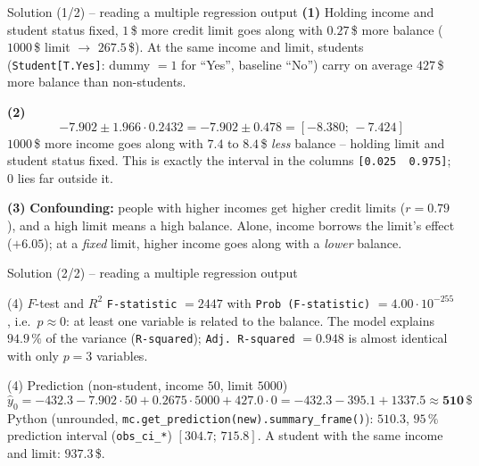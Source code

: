 \documentclass[aspectratio=169,11pt]{beamer}
\begin{document}
\begin{frame}{Solution (1/2) -- reading a multiple regression output}
  \textbf{(1)} Holding income and student status fixed, $1$\,\$ more credit
  limit goes along with $0.27$\,\$ more balance ($1000$\,\$ limit
  $\to$ $267.5$\,\$). At the same income and limit, students
  (\texttt{Student[T.Yes]}: dummy $=1$ for ``Yes'', baseline ``No'') carry on
  average $427$\,\$ more balance than non-students.

  \medskip
  \textbf{(2)}
  \[
    -7.902\pm1.966\cdot0.2432=-7.902\pm0.478=[-8.380;\,-7.424]
  \]
  $1000$\,\$ more income goes along with $7.4$ to $8.4$\,\$ \emph{less} balance
  -- holding limit and student status fixed. This is exactly the interval in
  the columns \texttt{[0.025\ \ 0.975]}; $0$ lies far outside it.

  \medskip
  \textbf{(3)} \textbf{Confounding:} people with higher incomes get higher
  credit limits ($r=0.79$), and a high limit means a high balance. Alone,
  income borrows the limit's effect ($+6.05$); at a \emph{fixed} limit,
  higher income goes along with a \emph{lower} balance.
\end{frame}

\begin{frame}{Solution (2/2) -- reading a multiple regression output}
  \begin{exampleblock}{(4) $F$-test and $R^2$}
    \texttt{F-statistic} $=2447$ with \texttt{Prob (F-statistic)}
    $=4.00\cdot10^{-255}$, i.e.\ $p\approx0$: at least one variable is related
    to the balance. The model explains $94.9\,\%$ of the variance
    (\texttt{R-squared}); \texttt{Adj.\ R-squared} $=0.948$ is almost
    identical with only $p=3$ variables.
  \end{exampleblock}
  \begin{exampleblock}{(4) Prediction (non-student, income $50$, limit $5000$)}
    \[
      \hat y_0=-432.3-7.902\cdot50+0.2675\cdot5000+427.0\cdot0
             =-432.3-395.1+1337.5\approx\mathbf{510}\,\$
    \]
    Python (unrounded, \texttt{mc.get\_prediction(new).summary\_frame()}):
    $510.3$, $95\,\%$ prediction interval (\texttt{obs\_ci\_*})
    $[304.7;\,715.8]$. A student with the same income and limit: $937.3$\,\$.
  \end{exampleblock}
\end{frame}
\end{document}
